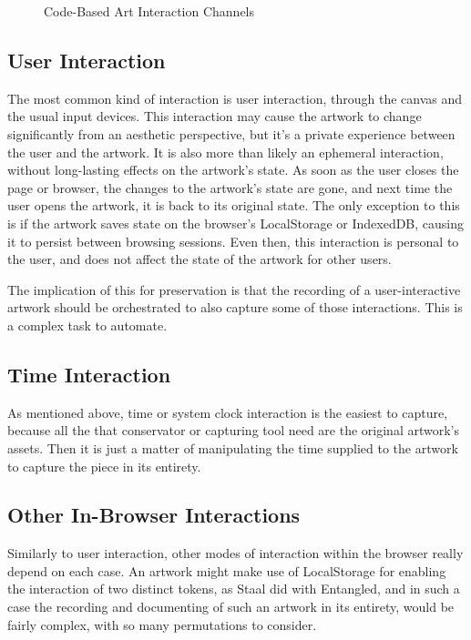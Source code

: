 \begin{figure}[h]
    \centering
    \captionsetup{justification=centering}
    
    \caption[Code-Based Art Interaction Channels]{Code-Based Art Interaction Channels}
    \label{fig:code-based-art-interactions}
\end{figure}

\subsection{User Interaction}

The most common kind of interaction is user interaction, through the canvas and the usual input devices. This interaction may cause the artwork to change significantly from an aesthetic perspective, but it's a private experience between the user and the artwork. It is also more than likely an ephemeral interaction, without long-lasting effects on the artwork's state. As soon as the user closes the page or browser, the changes to the artwork's state are gone, and next time the user opens the artwork, it is back to its original state. The only exception to this is if the artwork saves state on the browser's LocalStorage or IndexedDB, causing it to persist between browsing sessions. Even then, this interaction is personal to the user, and does not affect the state of the artwork for other users.

The implication of this for preservation is that the recording of a user-interactive artwork should be orchestrated to also capture some of those interactions. This is a complex task to automate.

\subsection{Time Interaction}

As mentioned above, time or system clock interaction is the easiest to capture, because all the that conservator or capturing tool need are the original artwork's assets. Then it is just a matter of manipulating the time supplied to the artwork to capture the piece in its entirety.

\subsection{Other In-Browser Interactions}

Similarly to user interaction, other modes of interaction within the browser really depend on each case. An artwork might make use of LocalStorage for enabling the interaction of two distinct tokens, as Staal did with Entangled, and in such a case the recording and documenting of such an artwork in its entirety, would be fairly complex, with so many permutations to consider.


